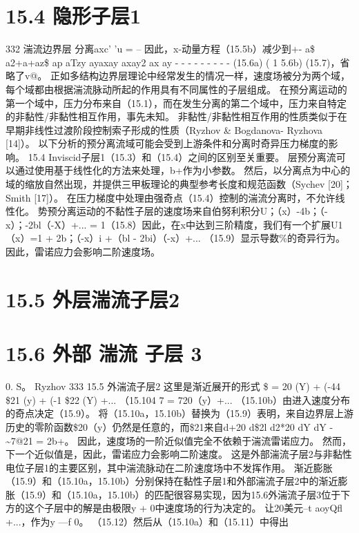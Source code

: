 \documentclass[UTF8,11pt,a4paper,openany,fontset=fandol]{ctexbook}
\begin{document}
\section{15.4 隐形子层1}
332 湍流边界层 分离axc' 'u = -- 因此，x-动量方程（15.5b）减少到+- a\$ a2+a+az\$ ap aTzy ayaxay axay2 ax ay - - - - - - - - - (15.6a) ( 1 5.6b) (15.7)，省略了v@。 正如多结构边界层理论中经常发生的情况一样，速度场被分为两个域，每个域都由根据湍流脉动所起的作用具有不同属性的子层组成。 在预分离运动的第一个域中，压力分布来自（15.1），而在发生分离的第二个域中，压力来自特定的非黏性/非黏性相互作用，事先未知。 非黏性/非黏性相互作用的性质类似于在早期非线性过渡阶段控制索子形成的性质（Ryzhov \& Bogdanova- Ryzhova [14]）。 以下分析的预分离流域可能会受到上游条件和分离时奇异压力梯度的影响。 15.4 Inviscid子层1（15.3）和（15.4）之间的区别至关重要。 层预分离流可以通过使用基于线性化的方法来处理，b+作为小参数。 然后，以分离点为中心的域的缩放自然出现，并提供三甲板理论的典型参考长度和规范函数（Sychev [20]；Smith [17]）。 在压力梯度中处理由强奇点（15.4）控制的湍流分离时，不允许线性化。 势预分离运动的不黏性子层的速度场来自伯努利积分U；（x）-4b；（-x）；-2bl（-X）+... = 1（15.8）因此，在x中达到三阶精度，我们有一个扩展U1（x）=1 + 2b；（-x）i +（bl - 2bi）（-x）+... （15.9）显示导数\%的奇异行为。 因此，雷诺应力会影响二阶速度场。

\section{15.5 外层湍流子层2}
\section{15.6 外部 湍流 子层 3}
0. S。 Ryzhov 333 15.5 外湍流子层2 这里是渐近展开的形式 \$ = 20 (Y) + (-44 \$21 (y) + (-1 \$22 (Y) +... （15.104 7 = 720（y）+... （15.10b）由进入速度分布的奇点决定（15.9）。 将（15.10a，15.10b）替换为（15.9）表明，来自边界层上游历史的零阶函数\$20（y）仍然是任意的，而\$21来自d+20 d\$2l d2*20 dY dY -\textasciitilde{}7@21 = 2b+。 因此，速度场的一阶近似值完全不依赖于湍流雷诺应力。 然而，下一个近似值是，因此，雷诺应力会影响二阶速度。 这是外部湍流子层2与非黏性电位子层1的主要区别，其中湍流脉动在二阶速度场中不发挥作用。 渐近膨胀（15.9）和（15.10a，15.10b）分别保持在黏性子层1和外部湍流子层2中的渐近膨胀（15.9）和（15.10a，15.10b）的匹配很容易实现，因为15.6外湍流子层3位于下方的这个子层中的解是由极限y + 0中速度场的行为决定的。 让20美元--t aoyQfl +...，作为y ---f 0。 （15.12）然后从（15.10a）和（15.11）中得出
\end{document}
